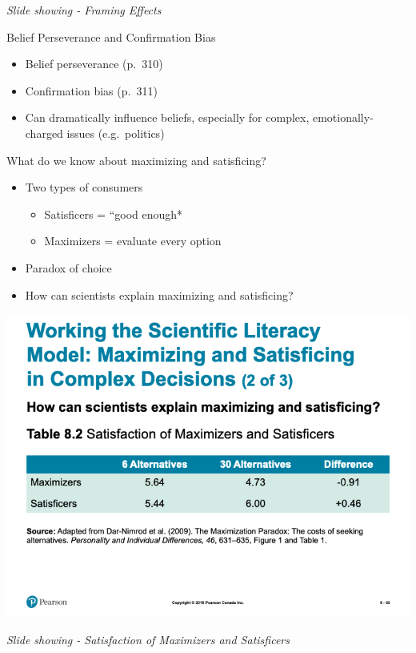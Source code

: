 \documentclass[
]{book}
\providecommand{\tightlist}{%
  \setlength{\itemsep}{0pt}\setlength{\parskip}{0pt}}
\begin{document}
\begin{reflect}
\emph{Slide showing - Framing Effects}

Belief Perseverance and Confirmation Bias

\begin{itemize}
\item
  Belief perseverance (p.~310)\\
\item
  Confirmation bias (p.~311)
\item
  Can dramatically influence beliefs, especially for complex, emotionally-charged issues (e.g.~politics)
\end{itemize}

What do we know about maximizing and satisficing?

\begin{itemize}
\item
  Two types of consumers

  \begin{itemize}
  \tightlist
  \item
    Satisficers = ``good enough*\\
  \item
    Maximizers = evaluate every option\\
  \end{itemize}
\item
  Paradox of choice
\item
  How can scientists explain maximizing and satisficing?
\end{itemize}

\includegraphics{assets/unit_1/slide_66.png}

\emph{Slide showing - Satisfaction of Maximizers and Satisficers}


\end{reflect}
\end{document}
